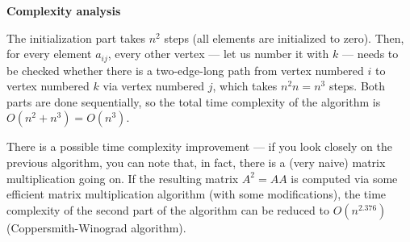 \textbf{Complexity analysis}

The initialization part takes $n^{2}$ steps (all elements are initialized to
zero). Then, for every element $a_{ij}$, every other vertex --- let us number
it with $k$ --- needs to be checked whether there is a two-edge-long path from
vertex numbered $i$ to vertex numbered $k$ via vertex numbered $j$, which takes
$n^{2}n = n^{3}$ steps. Both parts are done sequentially, so the total time
complexity of the algorithm is $O(n^{2} + n^{3}) = O(n^{3})$.

There is a possible time complexity improvement --- if you look closely on the
previous algorithm, you can note that, in fact, there is a (very naive) matrix
multiplication going on. If the resulting matrix $A^{2} = AA$ is computed via
some efficient matrix multiplication algorithm (with some modifications), the
time complexity of the second part of the algorithm can be reduced to
$O(n^{2.376})$ (Coppersmith-Winograd algorithm).

